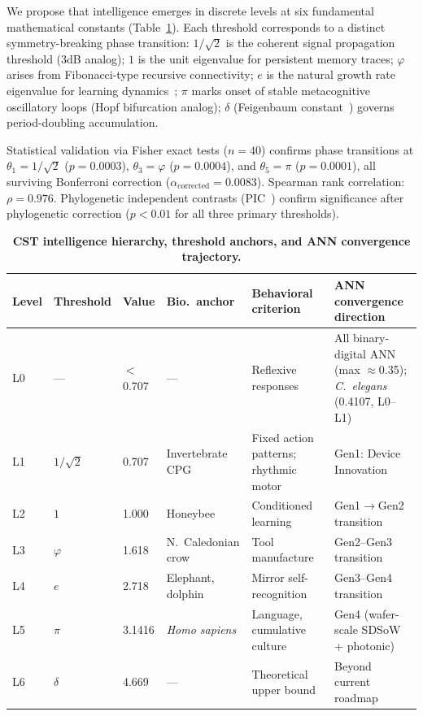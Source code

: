 \documentclass[12pt]{article}
\begin{document}
We propose that intelligence emerges in discrete levels at six fundamental mathematical constants (Table~\ref{tab:hierarchy}). Each threshold corresponds to a distinct symmetry-breaking phase transition: $1/\sqrt{2}$ is the coherent signal propagation threshold (3dB analog); $1$ is the unit eigenvalue for persistent memory traces; $\varphi$ arises from Fibonacci-type recursive connectivity; $e$ is the natural growth rate eigenvalue for learning dynamics~\cite{hebb1949}; $\pi$ marks onset of stable metacognitive oscillatory loops (Hopf bifurcation analog); $\delta$ (Feigenbaum constant~\cite{feigenbaum1978}) governs period-doubling accumulation.

Statistical validation via Fisher exact tests ($n = 40$) confirms phase transitions at $\theta_1 = 1/\sqrt{2}$ ($p = 0.0003$), $\theta_3 = \varphi$ ($p = 0.0004$), and $\theta_5 = \pi$ ($p = 0.0001$), all surviving Bonferroni correction ($\alpha_{\mathrm{corrected}} = 0.0083$). Spearman rank correlation: $\rho = 0.976$. Phylogenetic independent contrasts (PIC~\cite{felsenstein1985}) confirm significance after phylogenetic correction ($p < 0.01$ for all three primary thresholds).

\begin{table}[H]
\centering
\caption{\textbf{CST intelligence hierarchy, threshold anchors, and ANN convergence trajectory.}}
\label{tab:hierarchy}
\small
\begin{tabular}{p{0.5cm}p{1.2cm}p{0.7cm}p{2.5cm}p{3.0cm}p{4.0cm}}
\toprule
\textbf{Level} & \textbf{Threshold} & \textbf{Value} & \textbf{Bio.\ anchor} & \textbf{Behavioral criterion} & \textbf{ANN convergence direction} \\
\midrule
L0 & --- & $<$0.707 & --- & Reflexive responses & All binary-digital ANN (max $\approx$0.35); \textit{C.\ elegans} (0.4107, L0--L1) \\
L1 & $1/\sqrt{2}$ & 0.707 & Invertebrate CPG & Fixed action patterns; rhythmic motor & Gen1: Device Innovation \\
L2 & $1$ & 1.000 & Honeybee & Conditioned learning~\cite{menzel1999} & Gen1$\to$Gen2 transition \\
L3 & $\varphi$ & 1.618 & N.~Caledonian crow & Tool manufacture~\cite{hunt1996} & Gen2--Gen3 transition \\
L4 & $e$ & 2.718 & Elephant, dolphin & Mirror self-recognition~\cite{plotnik2006,reiss2001} & Gen3--Gen4 transition \\
L5 & $\pi$ & 3.1416 & \textit{Homo sapiens} & Language, cumulative culture~\cite{roth2005} & Gen4 (wafer-scale SDSoW + photonic) \\
L6 & $\delta$ & 4.669 & --- & Theoretical upper bound & Beyond current roadmap \\
\bottomrule
\end{tabular}
\end{table}
\end{document}
